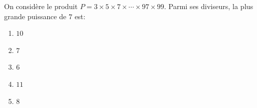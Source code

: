 % 
%
\label{1.5}
On considère le produit $P = 3 \times 5 \times 7 \times \cdots \times 97 \times 99$. Parmi ses diviseurs, la plus grande %
puissance de $7$ est:
%
\begin{enumerate}
  \item $10$
  \item $7$
  \item $6$
  \item $11$
  \item $8$
\end{enumerate}
%
